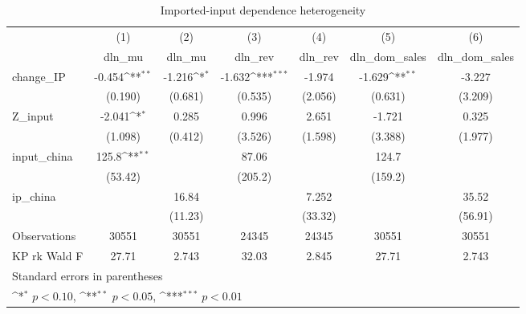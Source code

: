 \begin{table}[htbp]\centering
\def\sym#1{\ifmmode^{#1}\else\(^{#1}\)\fi}
\caption{Imported-input dependence heterogeneity}
\begin{tabular}{l*{6}{c}}
\hline\hline
            &\multicolumn{1}{c}{(1)}&\multicolumn{1}{c}{(2)}&\multicolumn{1}{c}{(3)}&\multicolumn{1}{c}{(4)}&\multicolumn{1}{c}{(5)}&\multicolumn{1}{c}{(6)}\\
            &\multicolumn{1}{c}{dln\_mu}&\multicolumn{1}{c}{dln\_mu}&\multicolumn{1}{c}{dln\_rev}&\multicolumn{1}{c}{dln\_rev}&\multicolumn{1}{c}{dln\_dom\_sales}&\multicolumn{1}{c}{dln\_dom\_sales}\\
\hline
change\_IP   &      -0.454\sym{**} &      -1.216\sym{*}  &      -1.632\sym{***}&      -1.974         &      -1.629\sym{**} &      -3.227         \\
            &     (0.190)         &     (0.681)         &     (0.535)         &     (2.056)         &     (0.631)         &     (3.209)         \\
[1em]
Z\_input     &      -2.041\sym{*}  &       0.285         &       0.996         &       2.651         &      -1.721         &       0.325         \\
            &     (1.098)         &     (0.412)         &     (3.526)         &     (1.598)         &     (3.388)         &     (1.977)         \\
[1em]
input\_china &       125.8\sym{**} &                     &       87.06         &                     &       124.7         &                     \\
            &     (53.42)         &                     &     (205.2)         &                     &     (159.2)         &                     \\
[1em]
ip\_china    &                     &       16.84         &                     &       7.252         &                     &       35.52         \\
            &                     &     (11.23)         &                     &     (33.32)         &                     &     (56.91)         \\
\hline
Observations&       30551         &       30551         &       24345         &       24345         &       30551         &       30551         \\
KP rk Wald F&       27.71         &       2.743         &       32.03         &       2.845         &       27.71         &       2.743         \\
\hline\hline
\multicolumn{7}{l}{\footnotesize Standard errors in parentheses}\\
\multicolumn{7}{l}{\footnotesize \sym{*} \(p<0.10\), \sym{**} \(p<0.05\), \sym{***} \(p<0.01\)}\\
\end{tabular}
\end{table}

